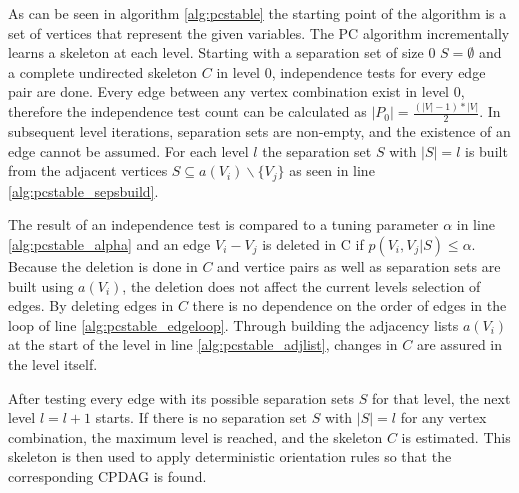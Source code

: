 As can be seen in algorithm \ref{alg:pcstable} the starting point of the algorithm is a set of vertices that represent the given variables. The PC algorithm incrementally learns a skeleton at each level. Starting with a separation set of size 0 $S = \emptyset$ and a complete undirected skeleton $C$ in level 0, independence tests for every edge pair are done. Every edge between any vertex combination exist in level 0, therefore the independence test count can be calculated as $|P_0| = \frac{(|V| - 1) * |V|}{2}$. In subsequent level iterations, separation sets are non-empty, and the existence of an edge cannot be assumed. For each level $l$ the separation set $S$ with $|S| = l$ is built from the adjacent vertices $S \subseteq a(V_i ) \backslash \{V_j \}$ as seen in line \ref{alg:pcstable_sepsbuild}.

The result of an independence test is compared to a tuning parameter $\alpha$ in line \ref{alg:pcstable_alpha} and an edge $V_i - V_j$ is deleted in C if $p(V_i,V_j|S) \leq \alpha$. Because the deletion is done in $C$ and vertice pairs as well as separation sets are built using $a(V_i)$, the deletion does not affect the current levels selection of edges. By deleting edges in $C$ there is no dependence on the order of edges in the loop of line \ref{alg:pcstable_edgeloop}. Through building the adjacency lists $a(V_i)$ at the start of the level in line \ref{alg:pcstable_adjlist}, changes in $C$ are assured in the level itself.

After testing every edge with its possible separation sets $S$ for that level, the next level $l=l+1$ starts. If there is no separation set $S$ with $|S| = l$ for any vertex combination, the maximum level is reached, and the skeleton $C$ is estimated.
This skeleton is then used to apply deterministic orientation rules so that the corresponding CPDAG is found. \cite{colomboOrderIndependentConstraintBasedCausal,kalischEstimatingHighDimensionalDirected2007,pearlIntroductionCausalInference2010,schmidtOrderIndependentConstraintBasedCausal2018}
